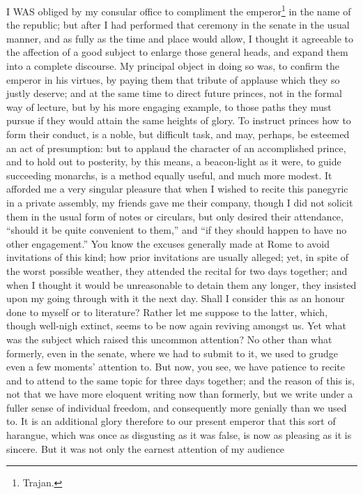 I WAS obliged by my consular office to compliment the emperor\footnote{Trajan.} in
the name of the republic; but after I had performed that ceremony in the
senate in the usual manner, and as fully as the time and place would
allow, I thought it agreeable to the affection of a good subject to
enlarge those general heads, and expand them into a complete discourse. My
principal object in doing so was, to confirm the emperor in his virtues,
by paying them that tribute of applause which they so justly deserve; and
at the same time to direct future princes, not in the formal way of
lecture, but by his more engaging example, to those paths they must pursue
if they would attain the same heights of glory. To instruct princes how to
form their conduct, is a noble, but difficult task, and may, perhaps, be
esteemed an act of presumption: but to applaud the character of an
accomplished prince, and to hold out to posterity, by this means, a
beacon-light as it were, to guide succeeding monarchs, is a method equally
useful, and much more modest. It afforded me a very singular pleasure that
when I wished to recite this panegyric in a private assembly, my friends
gave me their company, though I did not solicit them in the usual form of
notes or circulars, but only desired their attendance, ``should it be quite
convenient to them,'' and ``if they should happen to have no other
engagement.'' You know the excuses generally made at Rome to avoid
invitations of this kind; how prior invitations are usually alleged; yet,
in spite of the worst possible weather, they attended the recital for two
days together; and when I thought it would be unreasonable to detain them
any longer, they insisted upon my going through with it the next day.
Shall I consider this as an honour done to myself or to literature? Rather
let me suppose to the latter, which, though well-nigh extinct, seems to be
now again reviving amongst us. Yet what was the subject which raised this
uncommon attention? No other than what formerly, even in the senate, where
we had to submit to it, we used to grudge even a few moments' attention
to. But now, you see, we have patience to recite and to attend to the same
topic for three days together; and the reason of this is, not that we have
more eloquent writing now than formerly, but we write under a fuller sense
of individual freedom, and consequently more genially than we used to. It
is an additional glory therefore to our present emperor that this sort of
harangue, which was once as disgusting as it was false, is now as pleasing
as it is sincere. But it was not only the earnest attention of my audience
